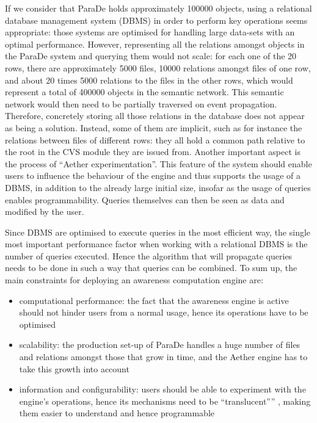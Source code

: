\documentclass{ecscw2007}
\begin{document}
If we consider that ParaDe holds approximately 100000 objects, using a relational database management system (DBMS) in order to perform key operations seems appropriate: those systems are optimised for handling large data-sets with an optimal performance. However, representing all the relations amongst objects in the ParaDe system and querying them would not scale: for each one of the 20 rows, there are approximately 5000 files, 10000 relations amongst files of one row, and about 20 times 5000 relations to the files in the other rows, which would represent a total of 400000 objects in the semantic network. This semantic network would then need to be partially traversed on event propagation. Therefore, concretely storing all those relations in the database does not appear as being a solution. Instead, some of them are implicit, such as for instance the relations between files of different rows: they all hold a common path relative to the root in the CVS module they are issued from.
Another important aspect is the process of ``Aether experimentation''. This feature of the system should enable users to influence the behaviour of the engine and thus supports the usage of a DBMS, in addition to the already large initial size, insofar as the usage of queries enables programmability. Queries themselves can then be seen as data and modified by the user.

Since DBMS are optimised to execute queries in the most efficient way, the single most important performance factor when working with a relational DBMS is the number of queries executed. Hence the algorithm that will propagate queries needs to be done in such a way that queries can be combined.
To sum up, the main constraints for deploying an awareness computation engine are:
\begin{itemize}
     \item computational performance: the fact that the awareness engine is active should not hinder users from a normal usage, hence its operations have to be optimised
     \item scalability: the production set-up of ParaDe handles a huge number of files and relations amongst those that grow in time, and the Aether engine has to take this growth into account
     \item information and configurability: users should be able to experiment with the engine’s operations, hence its mechanisms need to be ``translucent'''' , making them easier to understand and hence programmable
\end{itemize}
\end{document}
